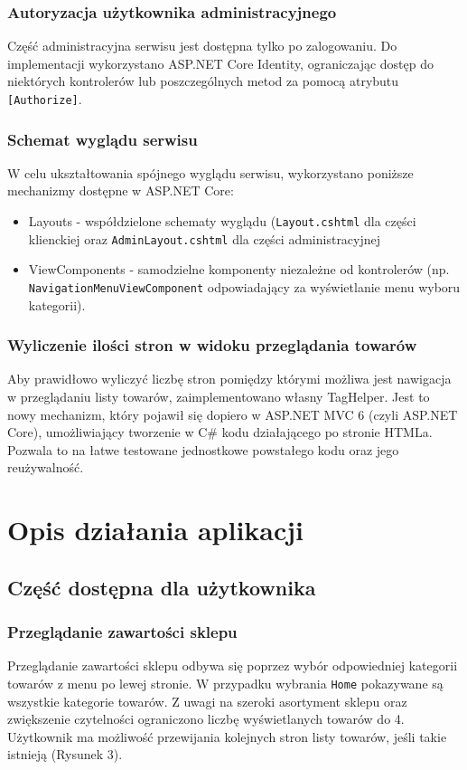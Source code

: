 \documentclass[a4paper,10pt]{article}
\begin{document}
\subsubsection{Autoryzacja użytkownika administracyjnego}
Część administracyjna serwisu jest dostępna tylko po zalogowaniu. Do implementacji wykorzystano ASP.NET Core Identity, ograniczając dostęp do niektórych kontrolerów lub poszczególnych metod za pomocą atrybutu \texttt{[Authorize]}.

\subsubsection{Schemat wyglądu serwisu}
W celu ukształtowania spójnego wyglądu serwisu, wykorzystano poniższe mechanizmy dostępne w ASP.NET Core:
\begin{itemize}
  \item Layouts - współdzielone schematy wyglądu (\texttt{Layout.cshtml} dla części klienckiej oraz \texttt{AdminLayout.cshtml} dla części administracyjnej
 \item ViewComponents - samodzielne komponenty niezależne od kontrolerów (np. \texttt{NavigationMenuViewComponent} odpowiadający za wyświetlanie menu wyboru kategorii).
\end{itemize}
 

\subsubsection{Wyliczenie ilości stron w widoku przeglądania towarów}
Aby prawidłowo wyliczyć liczbę stron pomiędzy którymi możliwa jest nawigacja w przeglądaniu listy towarów, zaimplementowano własny TagHelper. Jest to nowy mechanizm, który pojawił się dopiero w ASP.NET MVC 6 (czyli ASP.NET Core), umożliwiający tworzenie w C\# kodu działającego po stronie HTMLa. Pozwala to na łatwe testowane jednostkowe powstałego kodu oraz jego reużywalność.

\section{Opis działania aplikacji}
\subsection{Część dostępna dla użytkownika}
\subsubsection{Przeglądanie zawartości sklepu}
Przeglądanie zawartości sklepu odbywa się poprzez wybór odpowiedniej kategorii towarów z menu po lewej stronie. W przypadku wybrania \texttt{Home} pokazywane są wszystkie kategorie towarów. Z uwagi na szeroki asortyment sklepu oraz zwiększenie czytelności ograniczono liczbę wyświetlanych towarów do 4. Użytkownik ma możliwość przewijania kolejnych stron listy towarów, jeśli takie istnieją (Rysunek 3).
\end{document}
